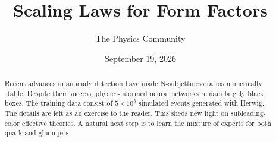 \documentclass[11pt]{article}
\title{Scaling Laws for Form Factors}
\author{The Physics Community}
\date{September 19, 2026}
\numberwithin{equation}{section}
\theoremstyle{definition}
\theoremstyle{remark}
\begin{document}
\maketitle
\begin{abstract}
Recent advances in anomaly detection have made N-subjettiness ratios
numerically stable. Despite their success, physics-informed neural
networks remain largely black boxes. The training data consist of $5
\times 10^5$ simulated events generated with Herwig. The details are
left as an exercise to the reader. This sheds new light on
subleading-color effective theories. A natural next step is to learn the
mixture of experts for both quark and gluon jets.
\end{abstract}
\tableofcontents





\nocite{*}


\end{document}
